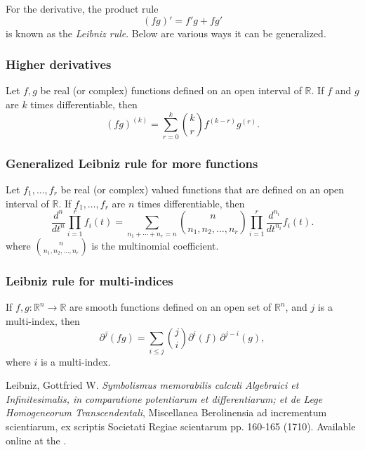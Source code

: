 \documentclass[12pt]{article}
\newcommand{\sR}[0]{\mathbb{R}}
\begin{document}
For the derivative, the product rule
$$
   (fg)' = f'g + fg'
$$
is known as the \emph{Leibniz rule}. Below are various ways it
can be generalized. 

\subsubsection*{Higher derivatives}
Let $f,g$ be real (or complex)
functions defined on an open interval of $\sR$. If
$f$ and $g$ are $k$ times differentiable, then
$$
   (fg)^{(k)} = \sum_{r=0}^k {k \choose r} f^{(k-r)} g^{(r)}.
$$

\subsubsection*{Generalized Leibniz rule for more functions}
Let $f_1,\ldots,f_r$ be real (or complex) valued functions 
that are defined on an open interval of $\mathbb{R}$.
If $f_1,\ldots,f_r$  are $n$ times differentiable, then
$$
   \frac{d^n}{dt^n}\prod_{i=1}^rf_i(t) = \sum_{n_1+\cdots+n_r=n} {n \choose n_1,n_2,\ldots,n_r} \prod_{i=1}^r \frac{d^{n_i}}{dt^{n_i}}f_i(t).
$$
where ${n \choose n_1,n_2,\ldots,n_r}$ is the multinomial coefficient.


\subsubsection*{Leibniz rule for multi-indices}
If $f,g:\sR^n \to \sR$ are smooth functions defined on an 
open set of $\sR^n$, and $j$ is a multi-index, then
$$ \partial^j(fg) = \sum_{i\le j} {j \choose i} \partial^i(f)\, \partial^{j-i}(g),$$
where $i$ is a multi-index.

\begin{thebibliography}{3}
Leibniz, Gottfried W. {\it Symbolismus memorabilis calculi Algebraici et Infinitesimalis, in comparatione potentiarum et differentiarum; et de Lege Homogeneorum Transcendentali}, Miscellanea Berolinensia ad incrementum 
scientiarum, ex scriptis Societati Regiae scientarum pp. 160-165 (1710).
Available online at the .
\end{thebibliography}
\end{document}
